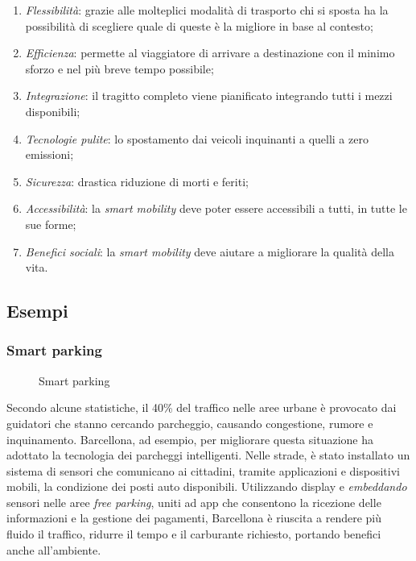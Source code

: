 \begin{enumerate}
    \item  \textit{Flessibilità}: grazie alle molteplici modalità di trasporto chi si sposta ha la possibilità di scegliere quale di queste è la migliore in base al contesto;
    \item  \textit{Efficienza}: permette al viaggiatore di arrivare a destinazione con il minimo sforzo e nel più breve tempo possibile;
    \item  \textit{Integrazione}: il tragitto completo viene pianificato integrando tutti i mezzi disponibili;
    \item \textit{Tecnologie pulite}: lo spostamento dai veicoli inquinanti a quelli a zero emissioni;
    \item \textit{Sicurezza}: drastica riduzione di morti e feriti; 
    \item \textit{Accessibilità}: la \textit{smart mobility} deve poter essere accessibili a tutti, in tutte le sue forme;
    \item \textit{Benefici sociali}: la \textit{smart mobility} deve aiutare a migliorare la qualità della vita. 
\end{enumerate}

\subsection{Esempi}

\subsubsection{Smart parking}

\begin{wrapfigure}{r}{0.4\textwidth}
\centering
{}
\caption{Smart parking}
\label{fig:smart_parking}
\end{wrapfigure}

Secondo alcune statistiche, il 40\% del traffico nelle aree urbane è provocato dai guidatori che stanno cercando parcheggio, causando congestione, rumore e inquinamento. Barcellona, ad esempio, per migliorare questa situazione ha adottato la tecnologia dei parcheggi intelligenti. Nelle strade, è stato installato un sistema di sensori che comunicano ai cittadini, tramite applicazioni e dispositivi mobili, la condizione dei posti auto disponibili. Utilizzando display e \textit{embeddando} sensori nelle aree \textit{free parking}, uniti ad app che consentono la ricezione delle informazioni e la gestione dei pagamenti, Barcellona è riuscita a rendere più fluido il traffico, ridurre il tempo e il carburante richiesto, portando benefici anche all'ambiente.  

